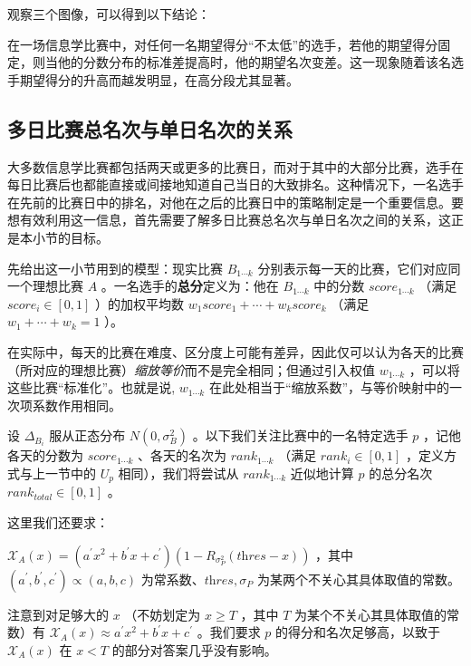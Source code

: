             观察三个图像，可以得到以下结论：

            \begin{tcolorbox}[colback=white,colframe=black,boxrule=0.5pt,arc=0pt]
                在一场信息学比赛中，对任何一名期望得分“不太低”的选手，若他的期望得分固定，则当他的分数分布的标准差提高时，他的期望名次变差。这一现象随着该名选手期望得分的升高而越发明显，在高分段尤其显著。
            \end{tcolorbox}

    \subsection{多日比赛总名次与单日名次的关系}\label{sec:relationBetweenEachDayAndTotal}

        大多数信息学比赛都包括两天或更多的比赛日，而对于其中的大部分比赛，选手在每日比赛后也都能直接或间接地知道自己当日的大致排名。这种情况下，一名选手在先前的比赛日中的排名，对他在之后的比赛日中的策略制定是一个重要信息。要想有效利用这一信息，首先需要了解多日比赛总名次与单日名次之间的关系，这正是本小节的目标。

        \vspace{1.5ex}

        先给出这一小节用到的模型：现实比赛 $B_{1\cdots k}$ 分别表示每一天的比赛，它们对应同一个理想比赛 $A$ 。一名选手的\textbf{总分}定义为：他在 $B_{1\cdots k}$ 中的分数 $\textit{score}_{1\cdots k}$ （满足 $\textit{score}_i\in[0,1]$ ）的加权平均数 $w_1\textit{score}_1+\cdots+w_k\textit{score}_k$ （满足 $w_1+\cdots+w_k=1$ ）。

        在实际中，每天的比赛在难度、区分度上可能有差异，因此仅可以认为各天的比赛（所对应的理想比赛）\emph{缩放等价}而不是完全相同；但通过引入权值 $w_{1\cdots k}$ ，可以将这些比赛“标准化”。也就是说, $w_{1\cdots k}$ 在此处相当于“缩放系数”，与等价映射中的一次项系数作用相同。

        设 $\Delta_{B_i}$ 服从正态分布 $N(0,\sigma_B^2)$ 。以下我们关注比赛中的一名特定选手 $p$ ，记他各天的分数为 $\textit{score}_{1\cdots k}$ 、各天的名次为 $\textit{rank}_{1\cdots k}$ （满足 $\textit{rank}_i\in [0,1]$ ，定义方式与上一节中的 $U_p$ 相同），我们将尝试从 $\textit{rank}_{1\cdots k}$ 近似地计算 $p$ 的总分名次 $\textit{rank}_{\textit{total}}\in [0,1]$ 。
        
        这里我们还要求：
        \begin{asparaitem}
            \item $\mathcal{X}_A(x)=\left(a^\prime x^2+b^\prime x+c^\prime\right)\left(1-R_{\sigma_P^2}(\textit{thres}-x)\right)$ ，其中 $(a^\prime,b^\prime,c^\prime)\propto (a,b,c)$ 为常系数、$\textit{thres},\sigma_P$ 为某两个不关心其具体取值的常数。
            \item 注意到对足够大的 $x$ （不妨划定为 $x\geq T$ ，其中 $T$ 为某个不关心其具体取值的常数）有 $\mathcal{X}_A(x)\approx a^\prime x^2+b^\prime x+c^\prime$ 。我们要求 $p$ 的得分和名次足够高，以致于 $\mathcal{X}_A(x)$ 在 $x<T$ 的部分对答案几乎没有影响。
        \end{asparaitem}

